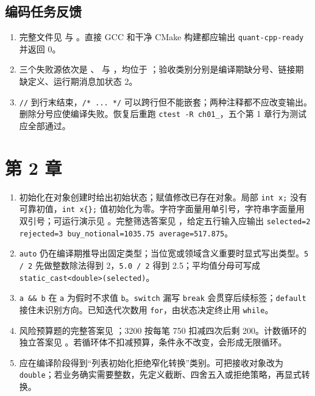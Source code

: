 \subsection*{编码任务反馈}
\begin{enumerate}
  \item 完整文件见  与 。直接 GCC 和干净 CMake 构建都应输出 \texttt{quant-cpp-ready} 并返回 0。
  \item 三个失败源依次是 、 与 ，均位于 ；验收类别分别是编译期缺分号、链接期缺定义、运行期消息加状态 2。
  \item \texttt{//} 到行末结束，\texttt{/* ... */} 可以跨行但不能嵌套；两种注释都不应改变输出。删除分号应使编译失败。恢复后重跑 \texttt{ctest -R ch01\_}，五个第 1 章行为测试应全部通过。
\end{enumerate}

\section{第 2 章}
\begin{enumerate}
  \item 初始化在对象创建时给出初始状态；赋值修改已存在对象。局部 \texttt{int x;} 没有可靠初值，\texttt{int x\{\};} 值初始化为零。字符字面量用单引号，字符串字面量用双引号；可运行演示见 。完整筛选答案见 ，给定五行输入应输出 \texttt{selected=2 rejected=3 buy\_notional=1035.75 average=517.875}。
  \item \texttt{auto} 仍在编译期推导出固定类型；当位宽或领域含义重要时显式写出类型。\texttt{5 / 2} 先做整数除法得到 2，\texttt{5.0 / 2} 得到 2.5；平均值分母可写成 \texttt{static\_cast<double>(selected)}。
  \item \lstinline|a && b| 在 \texttt{a} 为假时不求值 \texttt{b}。\texttt{switch} 漏写 \texttt{break} 会贯穿后续标签；\texttt{default} 接住未识别方向。已知迭代次数用 \texttt{for}，由状态决定终止用 \texttt{while}。
  \item 风险预算题的完整答案见 ；3200 按每笔 750 扣减四次后剩 200。计数循环的独立答案见 。若循环体不扣减预算，条件永不改变，会形成无限循环。
  \item {} 应在编译阶段得到“列表初始化拒绝窄化转换”类别。可把接收对象改为 \texttt{double}；若业务确实需要整数，先定义截断、四舍五入或拒绝策略，再显式转换。
\end{enumerate}

